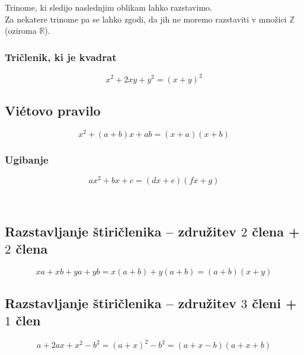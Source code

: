             
        Trinome, ki sledijo naslednjim oblikam lahko razstavimo. \\
        Za nekatere trinome pa se lahko zgodi, da jih ne moremo razstaviti v množici $\mathbb{Z}$ (oziroma $\mathbb{R}$).
        
        \subsubsection*{Tričlenik, ki je kvadrat}
            $$x^2+2xy+y^2=(x+y)^2$$
        

        \subsection*{Vi\'etovo pravilo}
        $$x^2+(a+b)x+ab=(x+a)(x+b)$$
    

        \subsubsection*{Ugibanje}
        $$ax^2+bx+c=(dx+e)(fx+g) $$
        
        
    ~\newline
        \subsection*{Razstavljanje štiričlenika -- združitev $2$ člena + $2$ člena}
        $$xa+xb+ya+yb=x(a+b)+y(a+b)=(a+b)(x+y)$$
    

        \subsection*{Razstavljanje štiričlenika -- združitev $3$ členi + $1$ člen}
        $$a+2ax+x^2-b^2=(a+x)^2-b^2=(a+x-b)(a+x+b)$$
            
    
        ~\newline
    
